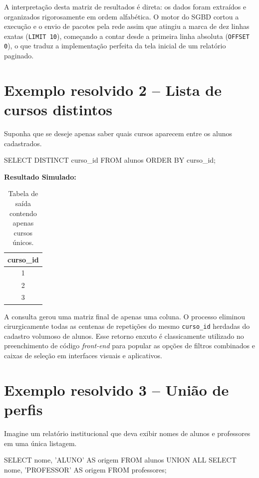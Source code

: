 A interpretação desta matriz de resultados é direta: os dados foram extraídos e organizados rigorosamente em ordem alfabética. O motor do SGBD cortou a execução e o envio de pacotes pela rede assim que atingiu a marca de dez linhas exatas (\texttt{LIMIT 10}), começando a contar desde a primeira linha absoluta (\texttt{OFFSET 0}), o que traduz a implementação perfeita da tela inicial de um relatório paginado.

\section{Exemplo resolvido 2 -- Lista de cursos distintos}

Suponha que se deseje apenas saber quais cursos aparecem entre os alunos cadastrados.

\begin{sqlcode}
SELECT DISTINCT curso_id
FROM alunos
ORDER BY curso_id;
\end{sqlcode}

\textbf{Resultado Simulado:}

\begin{table}[H]
    \centering
    \begin{tabular}{|c|}
    \hline
    \textbf{curso\_id} \\
    \hline
    1 \\
    2 \\
    3 \\
    \hline
    \end{tabular}
    \caption{Tabela de saída contendo apenas cursos únicos.}
\end{table}

A consulta gerou uma matriz final de apenas uma coluna. O processo eliminou cirurgicamente todas as centenas de repetições do mesmo \texttt{curso\_id} herdadas do cadastro volumoso de alunos. Esse retorno enxuto é classicamente utilizado no preenchimento de código \textit{front-end} para popular as opções de filtros combinados e caixas de seleção em interfaces visuais e aplicativos.

\section{Exemplo resolvido 3 -- União de perfis}

Imagine um relatório institucional que deva exibir nomes de alunos e professores em uma única listagem.

\begin{sqlcode}
SELECT nome, 'ALUNO' AS origem
FROM alunos
UNION ALL
SELECT nome, 'PROFESSOR' AS origem
FROM professores;
\end{sqlcode}

